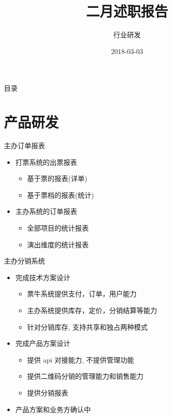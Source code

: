 \documentclass[presentation, bigger]{beamer}
\author{行业研发}
\date{2018-03-03}
\title{二月述职报告}
\begin{document}
\maketitle
\begin{frame}{目录}
\tableofcontents
\end{frame}


\section{产品研发}
\label{sec:orgfac02c6}
\begin{frame}[label={sec:orgc082391}]{主办订单报表}
\begin{itemize}
\item 打票系统的出票报表
\begin{itemize}
\item 基于票的报表(详单)
\item 基于票档的报表(统计)
\end{itemize}
\item 主办系统的订单报表
\begin{itemize}
\item 全部项目的统计报表
\item 演出维度的统计报表
\end{itemize}
\end{itemize}
\end{frame}

\begin{frame}[label={sec:orgbe7b56c}]{主办分销系统}
\begin{itemize}
\item 完成技术方案设计
\begin{itemize}
\item 票牛系统提供支付，订单，用户能力
\item 主办系统提供库存，定价，分销结算等能力
\item 针对分销库存, 支持共享和独占两种模式
\end{itemize}
\item 完成产品方案设计
\begin{itemize}
\item 提供 api 对接能力, 不提供管理功能
\item 提供二维码分销的管理能力和销售能力
\item 提供分销报表
\end{itemize}
\item 产品方案和业务方确认中
\end{itemize}
\end{frame}
\end{document}
